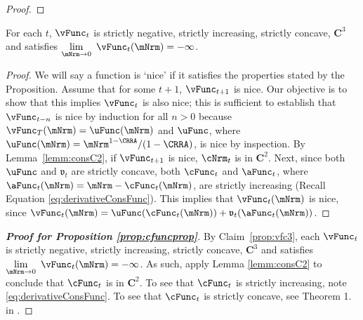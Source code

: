 \documentclass[\econtexRoot/BufferStockTheory]{subfiles}
\begin{document}
\begin{proof}
\end{proof}

\begin{claim}\label{prop:vfc3}
For each $t$, $\vFunc_{t}$ is strictly negative, strictly increasing, strictly concave, $\mathbf{C}^{3}$ and satisfies $\lim\limits_{\mNrm\rightarrow 0}~\vFunc_{t}(\mNrm) =-\infty $.
\end{claim}

\begin{proof}
%
We will say a function is `nice' if it satisfies the properties stated by the Proposition.
Assume that for some $t+1$, $\vFunc_{t+1}$ is nice.
Our objective is to show that this
implies $\vFunc_{t}$ is also nice; this is sufficient to establish that
$\vFunc_{t-n}$ is nice by induction for all $n > 0$ because $\vFunc_{T}(\mNrm)
=\uFunc(\mNrm) $ and $\uFunc$, where $\uFunc(\mNrm)=\mNrm^{1-\CRRA}/(1-\CRRA)$, is nice by inspection.
By Lemma~\ref{lemm:consC2}, if $\vFunc_{t+1}$ is nice, $\cNrm_{t}$ is in $\mathbf{C}^{2}$.
Next, since both $\uFunc$ and $\mathfrak{v}_{t}$ are strictly concave, both
$\cFunc_{t}$ and $\aFunc_{t}$, where $\aFunc_{t}(\mNrm)=\mNrm-\cFunc_{t}(\mNrm)$,
are strictly increasing (Recall Equation \eqref{eq:derivativeConsFunc}).
This implies that
$\vFunc_{t}(\mNrm)$ is nice, since
$\vFunc_{t}(\mNrm)=\uFunc(\cFunc_{t}(\mNrm))+\mathfrak{v}_{t}({\aFunc}_{t}(\mNrm))$.
\end{proof}

 
\hypertarget{cFunc-is-Twice-Continuously-Differentiable}{}
\begin{proof}[\textbf{\textit{Proof for Proposition \ref{prop:cfuncprop}}}]

By Claim~\ref{prop:vfc3}, each $\vFunc_{t}$ is strictly negative, strictly increasing, strictly concave, $\mathbf{C}^{3}$ and satisfies $\lim\limits_{\mNrm\rightarrow 0}~\vFunc_{t}(\mNrm) =-\infty $.
As such, apply Lemma \ref{lemm:consC2} to conclude that $\cFunc_{t}$ is in $\mathbf{C}^{2}$. To see that  $\cFunc_{t}$ is strictly increasing, note \eqref{eq:derivativeConsFunc}. To see that $\cFunc_{t}$  is strictly concave, see Theorem 1. in \cite{ckConcavity}.
\end{proof}
\end{document}
